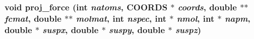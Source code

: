 \subsubsection{\setlength{\rightskip}{0pt plus 5cm}void proj\_\-force (int {\em natoms}, {\bf COORDS} $\ast$ {\em coords}, double $\ast$$\ast$ {\em fcmat}, double $\ast$$\ast$ {\em molmat}, int {\em nspec}, int $\ast$ {\em nmol}, int $\ast$ {\em napm}, double $\ast$ {\em suspx}, double $\ast$ {\em suspy}, double $\ast$ {\em suspz})}\label{subspace_2md__projforce_8c_e284b4aa67e8e9b33d1bbf5ed4d8765a}


